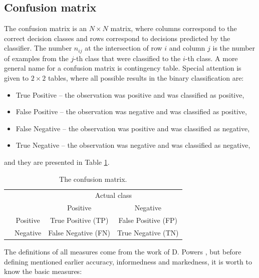 \documentclass[english]{pwr_wmat_praca_dyplomowa}
\theoremstyle{plain}
\numberwithin{theorem}{chapter}
\theoremstyle{definition}
\numberwithin{theorem}{chapter}
\begin{document}
	\subsection{Confusion matrix}
	
	The confusion matrix is an $N \times N$ matrix, where columns correspond to the correct decision classes and rows correspond to decisions predicted by the classifier. The number $n_{ij}$ at the intersection of row $i$ and column $j$ is the number of examples from the $j$-th class that were classified to the $i$-th class. A more general name for a confusion matrix is contingency table. Special attention is given to $2 \times 2$ tables, where all possible results in the binary classification are:
	
	\begin{itemize}
		\item True Positive -- the observation was positive and was classified as positive,
		\item False Positive -- the observation was negative and was classified as positive,
		\item False Negative -- the observation was positive and was classified as negative,
		\item True Negative -- the observation was negative and was classified as negative,
	\end{itemize}
	
	\noindent and they are presented in Table \ref{tab:confusion_matrix}.
	
	\begin{table}[H]
		\centering
		\begin{tabular}{c c | c | c} 
			& & \multicolumn{2}{c}{Actual class} \\
			& & Positive & Negative \\
			\hline
			{\rule{0pt}{3ex}} \multirow{2}{*}{Predicted class} & Positive & True Positive (TP) & False Positive (FP) \\\cmidrule{2-4}
			& Negative & False Negative (FN) & True Negative (TN)  \\
		\end{tabular}
		\caption{The confusion matrix.}
		\label{tab:confusion_matrix} 
	\end{table}
	
	The definitions of all measures come from the work of D. Powers \cite{powers2011evaluation}, but before defining mentioned earlier accuracy, informedness and markedness, it is worth to know the basic measures:
	
\end{document}
